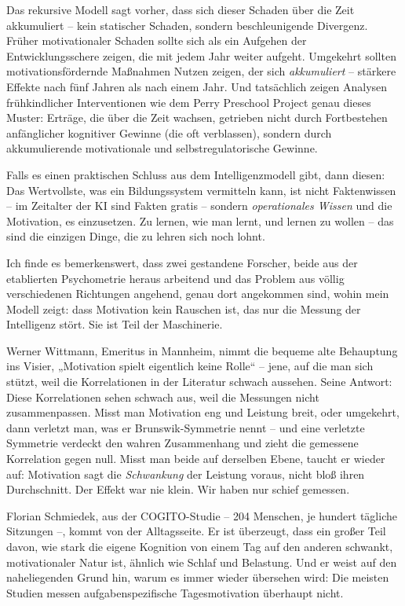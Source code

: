 \documentclass[11pt, twoside, openright]{book}
\begin{document}
Das rekursive Modell sagt vorher, dass sich dieser Schaden über die Zeit akkumuliert -- kein statischer Schaden, sondern beschleunigende Divergenz. Früher motivationaler Schaden sollte sich als ein Aufgehen der Entwicklungsschere zeigen, die mit jedem Jahr weiter aufgeht. Umgekehrt sollten motivationsfördernde Maßnahmen Nutzen zeigen, der sich \textit{akkumuliert} -- stärkere Effekte nach fünf Jahren als nach einem Jahr. Und tatsächlich zeigen Analysen frühkindlicher Interventionen wie dem Perry Preschool Project genau dieses Muster: Erträge, die über die Zeit wachsen, getrieben nicht durch Fortbestehen anfänglicher kognitiver Gewinne (die oft verblassen), sondern durch akkumulierende motivationale und selbstregulatorische Gewinne.

Falls es einen praktischen Schluss aus dem Intelligenzmodell gibt, dann diesen: Das Wertvollste, was ein Bildungssystem vermitteln kann, ist nicht Faktenwissen -- im Zeitalter der KI sind Fakten gratis -- sondern \textit{operationales Wissen} und die Motivation, es einzusetzen. Zu lernen, wie man lernt, und lernen zu wollen -- das sind die einzigen Dinge, die zu lehren sich noch lohnt.

Ich finde es bemerkenswert, dass zwei gestandene Forscher, beide aus der etablierten Psychometrie heraus arbeitend und das Problem aus völlig verschiedenen Richtungen angehend, genau dort angekommen sind, wohin mein Modell zeigt: dass Motivation kein Rauschen ist, das nur die Messung der Intelligenz stört. Sie ist Teil der Maschinerie.

Werner Wittmann, Emeritus in Mannheim, nimmt die bequeme alte Behauptung ins Visier, „Motivation spielt eigentlich keine Rolle“ -- jene, auf die man sich stützt, weil die Korrelationen in der Literatur schwach aussehen. Seine Antwort: Diese Korrelationen sehen schwach aus, weil die Messungen nicht zusammenpassen. Misst man Motivation eng und Leistung breit, oder umgekehrt, dann verletzt man, was er Brunswik-Symmetrie nennt -- und eine verletzte Symmetrie verdeckt den wahren Zusammenhang und zieht die gemessene Korrelation gegen null. Misst man beide auf derselben Ebene, taucht er wieder auf: Motivation sagt die \textit{Schwankung} der Leistung voraus, nicht bloß ihren Durchschnitt. Der Effekt war nie klein. Wir haben nur schief gemessen.

Florian Schmiedek, aus der COGITO-Studie -- 204 Menschen, je hundert tägliche Sitzungen --, kommt von der Alltagsseite. Er ist überzeugt, dass ein großer Teil davon, wie stark die eigene Kognition von einem Tag auf den anderen schwankt, motivationaler Natur ist, ähnlich wie Schlaf und Belastung. Und er weist auf den naheliegenden Grund hin, warum es immer wieder übersehen wird: Die meisten Studien messen aufgabenspezifische Tagesmotivation überhaupt nicht.
\end{document}

